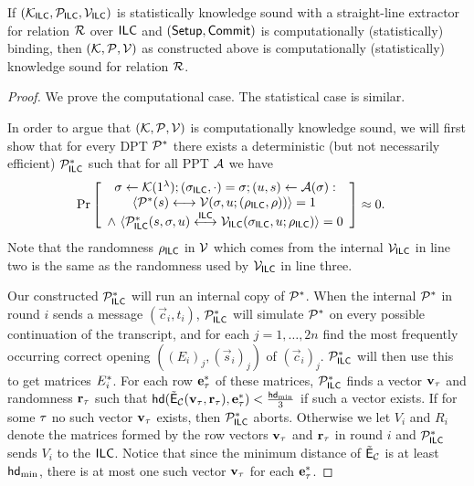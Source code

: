       \begin{theorem}\label{thm:sound}
    If $(\mathcal{K}_{\mathsf{ILC}},\mathcal{P}_{\mathsf{ILC}},\mathcal{V}_{\mathsf{ILC}})$ is statistically knowledge sound with a straight-line extractor for relation $\mathcal{R}$ over $\mathsf{ILC}$ and $(\mathsf{Setup},\mathsf{Commit})$ is computationally (statistically) binding, then $(\mathcal{K},\mathcal{P},\mathcal{V})$ as constructed above is computationally (statistically) knowledge sound for relation $\mathcal{R}$.
    \end{theorem}   
    \begin{proof}

We prove the computational case. The statistical case is similar.%


In order to argue that $(\mathcal{K},\mathcal{P},\mathcal{V})$ is computationally knowledge sound, we will first show that for every DPT $\mathcal{P}^*$ there exists a deterministic (but not necessarily efficient) $\mathcal{P}_{\mathsf{ILC}}^*$ such that for all PPT $\mathcal{A}$ we have 
\begin{align}\Pr&\left[\begin{array}{c} \mathsf{\sigma}\gets \mathcal{K}(1^{\lambda});(\mathsf{\sigma}_{\mathsf{ILC}},\cdot)=\mathsf{\sigma};(u,s) \gets \mathcal{A}(\mathsf{\sigma}):\\
\langle \mathcal{P}^*(s)\longleftrightarrow\mathcal{V}(\mathsf{\sigma},u;(\rho_{\mathsf{ILC}},\rho))\rangle = 1 \, \\
\wedge~~\langle \mathcal{P}_{\mathsf{ILC}}^*(s,\mathsf{\sigma},u)\overset{\mathsf{ILC}}{\longleftrightarrow}\mathcal{V}_{\mathsf{ILC}}(\mathsf{\sigma}_{\mathsf{ILC}},u;\rho_{\mathsf{ILC}})\rangle = 0
\end{array}
\right]\approx 0.\label{zkip:ineq:pilcstar}
\end{align}
Note that the randomness $\rho_{\mathsf{ILC}}$ in $\mathcal{V}$ which comes from the internal $\mathcal{V}_{\mathsf{ILC}}$ in line two is the same as the randomness used by $\mathcal{V}_{\mathsf{ILC}}$ in line three. 

Our constructed $\mathcal{P}_{\mathsf{ILC}}^*$ will run an internal copy of $\mathcal{P}^*$.
When the internal $\mathcal{P}^*$ in round $i$ sends a message $(\vec{c}_i,t_i)$, $\mathcal{P}_{\mathsf{ILC}}^*$ will simulate $\mathcal{P}^*$ on every possible continuation of the transcript, and for each $j=1,\ldots,2n$ find the most frequently occurring correct opening $((E_i)_j,(\vec{s}_i)_j)$ of $(\vec{c}_i)_j$. $\mathcal{P}_{\mathsf{ILC}}^*$ will then use this to get matrices $E^*_i$. For each row $\mathbf{e}^*_\tau$ of these matrices, $\mathcal{P}_{\mathsf{ILC}}^*$ finds a vector ${\mathbf{v}}_{\tau}$ and randomness $\mathbf{r}_\tau$ such that $\mathsf{hd}(\tilde{\mathsf{E}}_{\mathcal{C}}({\mathbf{v}}_\tau,\mathbf{r}_\tau),\mathbf{e}^*_\tau)<\frac{\mathsf{hd}_{\mathrm{min}}}{3}$ if such a vector exists.
If for some $\tau$ no such vector ${\mathbf{v}}_\tau$ exists, then $\mathcal{P}_{\mathsf{ILC}}^*$ aborts. Otherwise we let $V_i$ and $R_i$ denote the matrices formed by the row vectors $\mathbf{v}_\tau$ and $\mathbf{r}_\tau$ in round $i$ and $\mathcal{P}_{\mathsf{ILC}}^*$ sends $V_i$ to the $\mathsf{ILC}$.
Notice that since the minimum distance of $\tilde{\mathsf{E}}_{\mathcal{C}}$ is at least $\mathsf{hd}_{\mathrm{min}}$, there is at most one such vector ${\mathbf{v}}_\tau$ for each $\mathbf{e}^*_\tau$. 


\end{proof}
